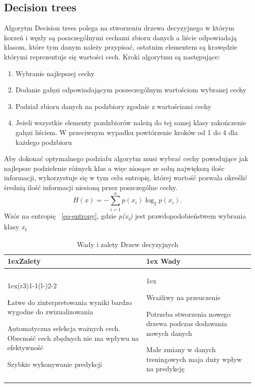 \subsection{Decision trees}

Algorytm Decision trees polega na stworzeniu drzewa decyzyjnego w którym korzeń i węzły
są poszczególnymi cechami zbioru danych a liście odpowiadają klasom, które tym danym 
należy przypisać, ostatnim elementem są krawędzie którymi reprezentuje się wartości cech. 
Kroki algorytmu są następujące:
\begin{enumerate}
    \item Wybranie najlepszej cechy
    \item Dodanie gałęzi odpowiadającym poszeczególnym wartościom wybranej cechy
    \item Podział zbioru danych na podzbiory zgodnie z wartościami cechy
    \item Jeżeli wszystkie elementy pozdzbiorów należą do tej samej klasy 
    zakończenie gałęzi liściem. W przeciwnym wypadku powtórzenie kroków 
    od 1 do 4 dla każdego podzbioru
\end{enumerate}
Aby dokonać optymalnego podziału algorytm musi wybrać cechy powodujące jak najlepsze
podzielenie różnych klas a więc niosące ze sobą największą ilośc informacji,
wykorzystuje się w tym celu entropię, której wartość pozwala określić średnią ilość 
informacji niesioną przez poszczególne cechy.
\begin{equation}
    H(x)=-\sum_{i=1}^n p(x_i) \log_2 p(x_i).
    \label{eq-entropy}
\end{equation}
Wzór na entropię ~\ref{eq-entropy}, gdzie \textit{p(x\textsubscript{i})} jest prawdopodobieństwem
wybrania klasy \textit{x\textsubscript{i}}
\begin{table}[h]
    \begin{tabularx}{\linewidth}{>{\parskip1ex}X@{\kern4\tabcolsep}>{\parskip1ex}X}
    \toprule
    \hfil\bfseries Zalety
    &
    \hfil\bfseries Wady
    \\\cmidrule(r{3\tabcolsep}){1-1}\cmidrule(l{-\tabcolsep}){2-2}
    
    Łatwe do zinterpretowania wyniki bardzo wygodne do zwizualizowania\par
    Automatyczna selekcja ważnych cech. Obecność cech zbędnych nie ma wpływu na efektywność\par
    Szybkie wykonywanie predykcji\par
    &
    
    Wrażliwy na przeuczenie\par
    Potrzeba stworzenia nowego drzewa podczas dodawania nowych danych\par
    Małe zmiany w danych treningowych maja duży wpływ na predykcję\par
    
    \\\bottomrule
    \end{tabularx}
    \caption{Wady i zalety Drzew decyzyjnych}
\end{table}

